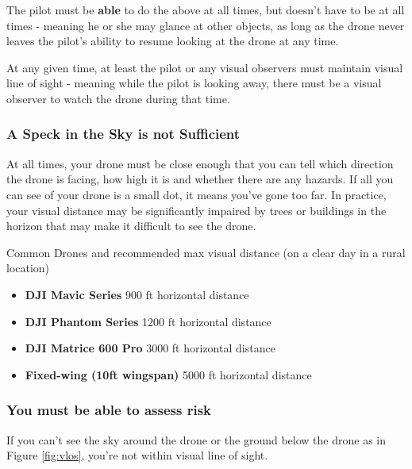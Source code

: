 \documentclass[
  12pt,
]{book}
\providecommand{\tightlist}{%
  \setlength{\itemsep}{0pt}\setlength{\parskip}{0pt}}
\begin{document}
The pilot must be \textbf{able} to do the above at all times, but doesn't have to be at all times - meaning he or she may glance at other objects, as long as the drone never leaves the pilot's ability to resume looking at the drone at any time.

At any given time, at least the pilot or any visual observers must maintain visual line of sight - meaning while the pilot is looking away, there must be a visual observer to watch the drone during that time.

\subsubsection{A Speck in the Sky is not Sufficient}\label{a-speck-in-the-sky-is-not-sufficient}

At all times, your drone must be close enough that you can tell which direction the drone is facing, how high it is and whether there are any hazards. If all you can see of your drone is a small dot, it means you've gone too far. In practice, your visual distance may be significantly impaired by trees or buildings in the horizon that may make it difficult to see the drone.

Common Drones and recommended max visual distance (on a clear day in a rural location)

\begin{itemize}
\tightlist
\item
  \textbf{DJI Mavic Series} 900 ft horizontal distance
\item
  \textbf{DJI Phantom Series} 1200 ft horizontal distance
\item
  \textbf{DJI Matrice 600 Pro} 3000 ft horizontal distance
\item
  \textbf{Fixed-wing (10ft wingspan)} 5000 ft horizontal distance
\end{itemize}

\subsubsection{You must be able to assess risk}\label{you-must-be-able-to-assess-risk}

If you can't see the sky around the drone or the ground below the drone as in Figure \ref{fig:vlos}, you're not within visual line of sight.
\end{document}
